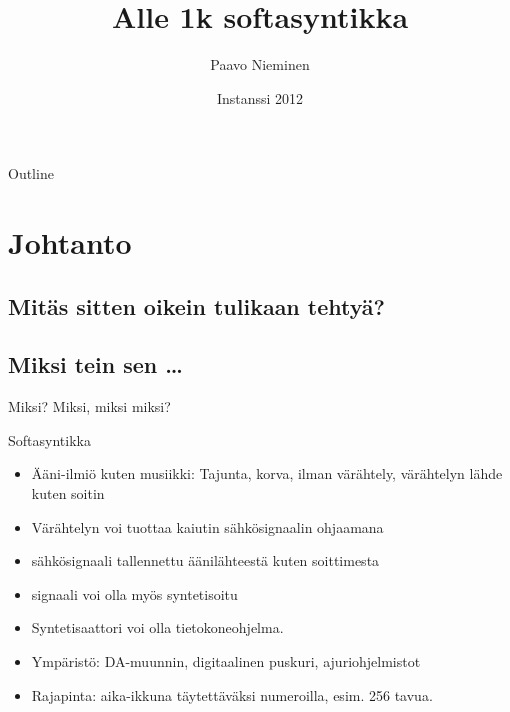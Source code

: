 \documentclass{beamer}
\title%
{Alle 1k softasyntikka}
\author{Paavo Nieminen}
\date{Instanssi 2012}
\begin{document}
\begin{frame}
  \titlepage
\end{frame}

\begin{frame}{Outline}
  \tableofcontents
\end{frame}






\section{Johtanto}

\subsection{Mitäs sitten oikein tulikaan tehtyä?}

\subsection{Miksi tein sen \ldots}
\begin{frame}{Miksi? Miksi, miksi miksi?}

\end{frame}


\begin{frame}{Softasyntikka}
\begin{itemize}
  \item Ääni-ilmiö kuten musiikki: Tajunta, korva, ilman värähtely,
    värähtelyn lähde kuten soitin
  \item Värähtelyn voi tuottaa kaiutin sähkösignaalin ohjaamana
  \item sähkösignaali tallennettu äänilähteestä kuten soittimesta
  \item signaali voi olla myös syntetisoitu
  \item Syntetisaattori voi olla tietokoneohjelma.
  \item Ympäristö: DA-muunnin, digitaalinen puskuri, ajuriohjelmistot
  \item Rajapinta: aika-ikkuna täytettäväksi numeroilla, esim. 256
    tavua.
\end{itemize}
\end{frame}
\end{document}
